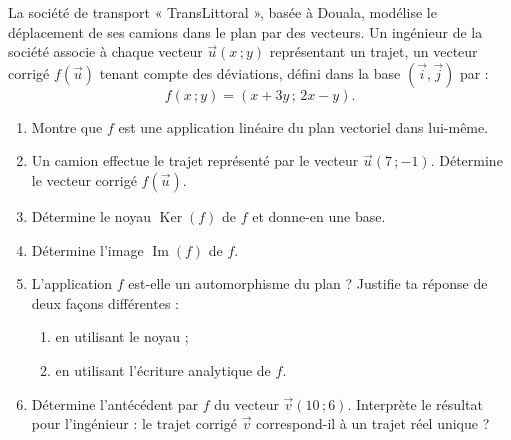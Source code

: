 \documentclass[11pt]{article}
\begin{document}
\begin{exercice}
La société de transport « TransLittoral », basée à Douala, modélise le déplacement de ses camions dans le plan par des vecteurs. Un ingénieur de la société associe à chaque vecteur $\vec{u}(x\,;y)$ représentant un trajet, un vecteur corrigé $f(\vec{u})$ tenant compte des déviations, défini dans la base $(\vec{i},\vec{j})$ par :
\[ f(x\,;y)=(x+3y\,;\,2x-y). \]
\begin{enumerate}
\item Montre que $f$ est une application linéaire du plan vectoriel dans lui-même.
\item Un camion effectue le trajet représenté par le vecteur $\vec{u}(7\,;-1)$. Détermine le vecteur corrigé $f(\vec{u})$.
\item Détermine le noyau $\operatorname{Ker}(f)$ de $f$ et donne-en une base.
\item Détermine l'image $\operatorname{Im}(f)$ de $f$.
\item L'application $f$ est-elle un automorphisme du plan ? Justifie ta réponse de deux façons différentes :
\begin{enumerate}
\item en utilisant le noyau ;
\item en utilisant l'écriture analytique de $f$.
\end{enumerate}
\item Détermine l'antécédent par $f$ du vecteur $\vec{v}(10\,;6)$. Interprète le résultat pour l'ingénieur : le trajet corrigé $\vec{v}$ correspond-il à un trajet réel unique ?
\end{enumerate}
\end{exercice}
\end{document}
